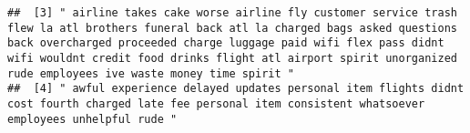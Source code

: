 \documentclass[
]{article}
\begin{document}
\begin{verbatim}
##  [3] " airline takes cake worse airline fly customer service trash flew la atl brothers funeral back atl la charged bags asked questions back overcharged proceeded charge luggage paid wifi flex pass didnt wifi wouldnt credit food drinks flight atl airport spirit unorganized rude employees ive waste money time spirit "                                                                                                                                                                                                                                                                                                                                                                                                                                                                                                                                                                                                                                                                                                                                                                                                                                                 
##  [4] " awful experience delayed updates personal item flights didnt cost fourth charged late fee personal item consistent whatsoever employees unhelpful rude "                                                                                                                                                                                                                                                                                                                                                                                                                                                                                                                                                                                                                                                                                                                                                                                                                                                                                                                                                                                                                 

\end{verbatim}
\end{document}
